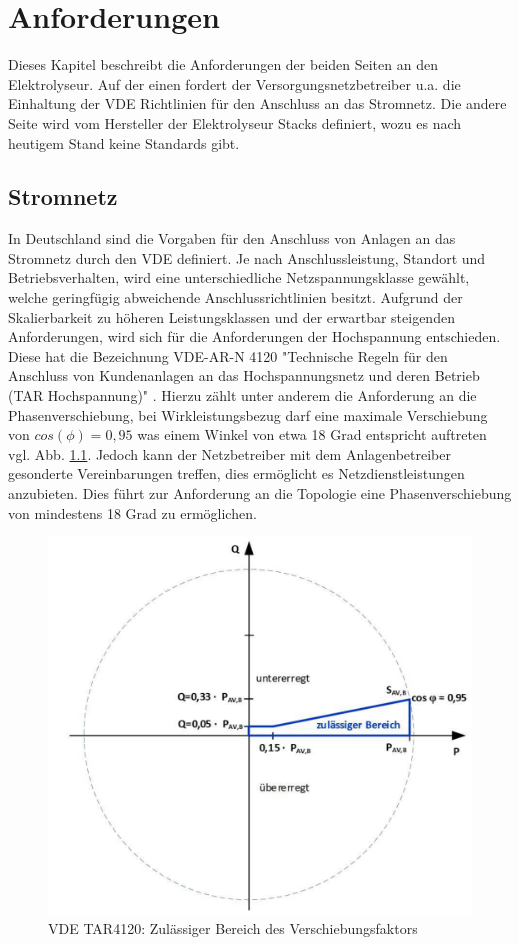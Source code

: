 \chapter{Anforderungen}
\label{chap:Anforderungen}
Dieses Kapitel beschreibt die Anforderungen der beiden Seiten an den Elektrolyseur. Auf der einen fordert der Versorgungsnetzbetreiber u.a. die Einhaltung der \gls{VDE} Richtlinien für den Anschluss an das Stromnetz. Die andere Seite wird vom Hersteller der Elektrolyseur Stacks definiert, wozu es nach heutigem Stand keine Standards gibt.
\section {Stromnetz}
In Deutschland sind die Vorgaben für den Anschluss von Anlagen an das Stromnetz durch den \gls{VDE} definiert. Je nach Anschlussleistung, Standort und Betriebsverhalten, wird eine unterschiedliche Netzspannungsklasse gewählt, welche geringfügig abweichende Anschlussrichtlinien besitzt. Aufgrund der Skalierbarkeit zu höheren Leistungsklassen und der erwartbar steigenden Anforderungen, wird sich für die Anforderungen der Hochspannung entschieden. Diese hat die Bezeichnung VDE-AR-N 4120 "Technische Regeln für den Anschluss von Kundenanlagen an das Hochspannungsnetz und deren Betrieb (TAR Hochspannung)" \cite{VDEARN4120}.
Hierzu zählt unter anderem die Anforderung an die Phasenverschiebung, bei Wirkleistungsbezug darf eine maximale Verschiebung von $cos(\phi)=0,95$ was einem Winkel von etwa 18 Grad entspricht auftreten vgl. Abb. \ref{fig:tar4120pq}. Jedoch kann der Netzbetreiber mit dem Anlagenbetreiber gesonderte Vereinbarungen treffen, dies ermöglicht es Netzdienstleistungen anzubieten. Dies führt zur Anforderung an die Topologie eine Phasenverschiebung von mindestens 18 Grad zu ermöglichen.\\
\begin{figure}[H]
	\centering
	\includegraphics[width=0.6\linewidth]{content/Grafiken/TAR4120_PQ}
	\caption[Zulässiger Bereich des Verschiebungsfaktors cos $\phi$ bei Wirkleistungsbezug]{VDE TAR4120: Zulässiger Bereich des Verschiebungsfaktors \cite{VDEARN4120}}
	\label{fig:tar4120pq}
\end{figure}
